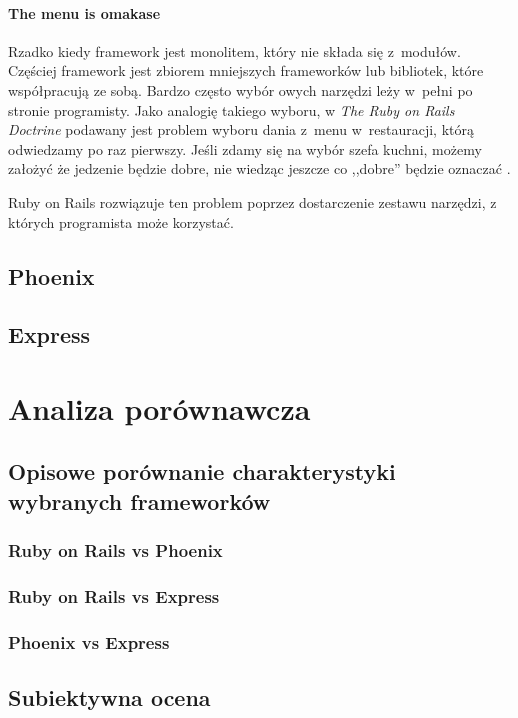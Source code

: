\documentclass[mgr,oneside]{mgr}
\begin{document}
\subsubsection{The menu is omakase}
Rzadko kiedy framework jest monolitem, który nie składa się z~modułów. Częściej framework jest zbiorem mniejszych frameworków lub bibliotek, które współpracują ze sobą. Bardzo często wybór owych narzędzi leży w~pełni po stronie programisty. Jako analogię takiego wyboru, w \emph{The Ruby on Rails Doctrine} podawany jest problem wyboru dania z~menu w~restauracji, którą odwiedzamy po raz pierwszy. Jeśli zdamy się na wybór szefa kuchni, możemy założyć że jedzenie będzie dobre, nie wiedząc jeszcze co ,,dobre'' będzie oznaczać \cite{rails_doctrine}.

Ruby on Rails rozwiązuje ten problem poprzez dostarczenie zestawu narzędzi, z których programista może korzystać.

\section{Phoenix} %
\section{Express}

\chapter{Analiza porównawcza}
\section{Opisowe porównanie charakterystyki wybranych frameworków}
\subsection{Ruby on Rails vs Phoenix}
\subsection{Ruby on Rails vs Express}
\subsection{Phoenix vs Express}
\section{Subiektywna ocena}
\end{document}
